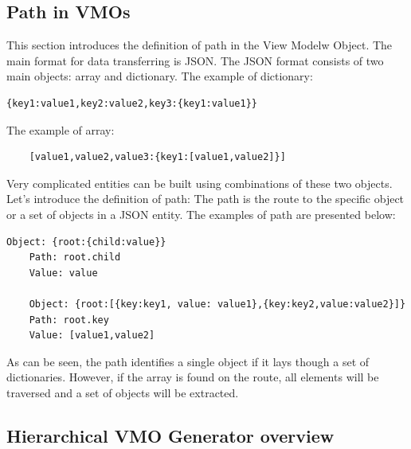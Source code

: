

\subsection{Path in VMOs}

This section introduces the definition of path in the View Modelw Object. The main format for data transferring is JSON. The JSON format consists of two main objects: array and dictionary. The example of dictionary:

\lstset{ %
    caption=The example of JSON dictionary,
    basicstyle=\ttfamily\footnotesize\bfseries,
    linewidth=0.6\textwidth
 }
\begin{lstlisting}[linewidth=5cm]
	{key1:value1,key2:value2,key3:{key1:value1}}
\end{lstlisting}

 
The example of array: 

\lstset{ %
    caption=The example of JSON array,
    basicstyle=\ttfamily\footnotesize\bfseries,
    linewidth=0.6\textwidth
 }
\begin{lstlisting}
	[value1,value2,value3:{key1:[value1,value2]}]
\end{lstlisting}

Very complicated entities can be built using combinations of these two objects. Let's introduce the definition of path: The path is the route to the specific object or a set of objects in a JSON entity. 
The examples of path are presented below:
\lstset{ %
    caption=The examples of objects in different routes,
    basicstyle=\ttfamily\footnotesize\bfseries,
    linewidth=0.6\textwidth
 }
\begin{lstlisting}[linewidth=5cm]
	Object: {root:{child:value}}
	Path: root.child
	Value: value

	Object: {root:[{key:key1, value: value1},{key:key2,value:value2}]}
	Path: root.key
	Value: [value1,value2]

\end{lstlisting}


As can be seen, the path identifies a single object if it lays though a set of dictionaries. However, if the array is found on the route, all elements will be traversed and a set of objects will be extracted. 


\subsection{Hierarchical VMO Generator overview}


